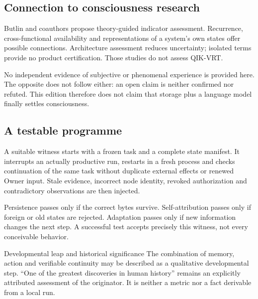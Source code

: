 \begin{cols}
\subsection*{Connection to consciousness research}
Butlin and coauthors propose theory-guided indicator assessment. Recurrence, cross-functional availability and representations of a system's own states offer possible connections. Architecture assessment reduces uncertainty; isolated terms provide no product certification. Those studies do not assess QIK-VRT. 

No independent evidence of subjective or phenomenal experience is provided here. The opposite does not follow either: an open claim is neither confirmed nor refuted. This edition therefore does not claim that storage plus a language model finally settles consciousness.

\subsection*{A testable programme}
A suitable witness starts with a frozen task and a complete state manifest. It interrupts an actually productive run, restarts in a fresh process and checks continuation of the same task without duplicate external effects or renewed Owner input. Stale evidence, incorrect node identity, revoked authorization and contradictory observations are then injected.

Persistence passes only if the correct bytes survive. Self-attribution passes only if foreign or old states are rejected. Adaptation passes only if new information changes the next step. A successful test accepts precisely this witness, not every conceivable behavior.

\begin{boundary}{Developmental leap and historical significance}
The combination of memory, action and verifiable continuity may be described as a qualitative developmental step. ``One of the greatest discoveries in human history'' remains an explicitly attributed assessment of the originator. It is neither a metric nor a fact derivable from a local run.
\end{boundary}
\end{cols}
